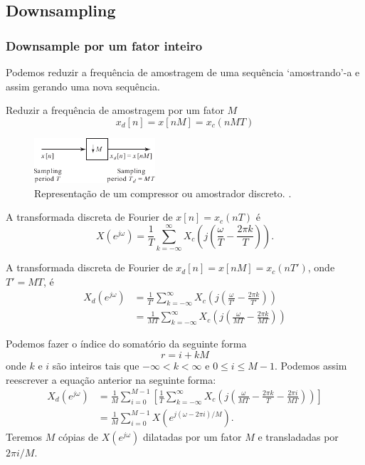 \subsection{Downsampling}
\begin{frame}[allowframebreaks]
  \frametitle{Downsample por um fator inteiro}
  Podemos reduzir a frequência de amostragem de uma sequência `amostrando'-a e assim
  gerando uma nova sequência.

  Reduzir a frequência de amostragem por um fator $M$
  \begin{equation}
   x_d[n] = x[nM] = x_c(nMT)
  \end{equation}

        \begin{figure}[h!]
        \centering
        \includegraphics[width=0.4\textwidth]{images/fig419.pdf}
        \caption{Representação de um compressor ou amostrador discreto. \citep{oppenheim2009}.}
        \label{fig:fig419}
        \end{figure}

  A transformada discreta de Fourier de $x[n] = x_c(nT)$ é
  \begin{equation}
  X(e^{j\omega}) = \frac{1}{T} \sum_{k=-\infty}^{\infty} X_c \left( j \left( \frac{\omega}{T} - \frac{2 \pi k}{T} \right) \right) .
  \end{equation}

  A transformada discreta de Fourier de $x_d[n] = x[nM] = x_c(nT')$, onde $T'=MT$, é
  \begin{align}
   X_d(e^{j\omega}) &= \frac{1}{T'} \sum_{k=-\infty}^{\infty} X_c \left( j \left( \frac{\omega}{T'} - \frac{2 \pi k}{T'} \right) \right) \\
                    &= \frac{1}{MT}  \sum_{k=-\infty}^{\infty} X_c \left( j \left( \frac{\omega}{MT} - \frac{2 \pi k}{MT} \right) \right)
  \end{align}

  \framebreak
  Podemos fazer o índice do somatório da seguinte forma
  \begin{equation}
  r = i + kM
  \end{equation}
  onde $k$ e $i$ são inteiros tais que $-\infty < k < \infty$ e $0 \leq i \leq M-1$.
  Podemos assim reescrever a equação anterior na seguinte forma:
  \begin{align}
  X_d(e^{j\omega}) &= \frac{1}{M} \sum_{i=0}^{M-1} \left[ \frac{1}{T} \sum_{k=-\infty}^{\infty} X_c \left( j \left( \frac{\omega}{MT} - \frac{2 \pi k}{T} - \frac{2\pi i}{MT} \right) \right)  \right] \\
                   &= \frac{1}{M} \sum_{i=0}^{M-1} X\left( e^{j(\omega - 2\pi i)/M} \right) .
  \end{align}
  Teremos $M$ cópias de $X(e^{j\omega})$ dilatadas por um fator $M$ e transladadas por $2\pi i/M$.



\end{frame}
